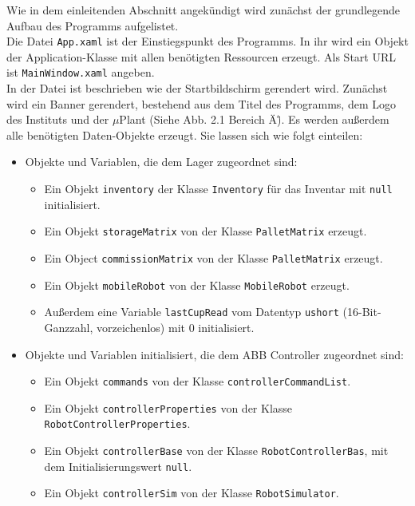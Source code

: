     Wie in dem einleitenden Abschnitt angekündigt wird zunächst der grundlegende Aufbau des Programms aufgelistet.
    \\
    Die Datei \verb|App.xaml| ist der Einstiegspunkt des Programms.
    In ihr wird ein Objekt der Application-Klasse mit allen benötigten Ressourcen erzeugt.
    Als Start URL ist \verb|MainWindow.xaml| angeben.
    \\
    In der Datei ist beschrieben wie der Startbildschirm gerendert wird.
    Zunächst wird ein Banner gerendert, bestehend aus dem Titel des Programms, dem Logo des Instituts und der $\mu$Plant
    (Siehe Abb. 2.1 Bereich \"A\").
    Es werden außerdem alle benötigten Daten-Objekte erzeugt.
    Sie lassen sich wie folgt einteilen:
    \\
    \begin{itemize}
        \item Objekte und Variablen, die dem Lager zugeordnet sind:
            \begin{itemize}
                \item Ein Objekt \verb|inventory| der Klasse \verb|Inventory| für das Inventar mit \verb|null| initialisiert.
                \item Ein Objekt \verb|storageMatrix| von der Klasse \verb|PalletMatrix| erzeugt.
                \item Ein Object \verb|commissionMatrix| von der Klasse \verb|PalletMatrix| erzeugt.
                \item Ein Objekt \verb|mobileRobot| von der Klasse \verb |MobileRobot| erzeugt.
                \item Außerdem eine Variable \verb|lastCupRead| vom Datentyp \verb|ushort| (16-Bit-Ganzzahl, vorzeichenlos) mit 0 initialisiert.
            \end{itemize}
            \item Objekte und Variablen initialisiert, die dem ABB Controller zugeordnet sind:
            \begin{itemize}
                \item Ein Objekt \verb|commands| von der Klasse \verb|controllerCommandList|.
                \item Ein Objekt \verb|controllerProperties| von der Klasse \verb|RobotControllerProperties|.
                \item Ein Objekt \verb|controllerBase| von der Klasse \verb|RobotControllerBas|, mit dem Initialisierungswert \verb|null|.
                \item Ein Objekt \verb|controllerSim| von der Klasse \verb|RobotSimulator|.
            \end{itemize}
    \end{itemize}
